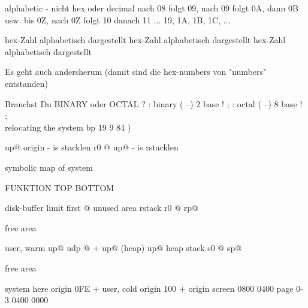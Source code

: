                                          
                                         
                                         
alphabetic - nicht hex oder decimal      
  nach 08 folgt 09, nach 09 folgt 0A,    
  dann 0B usw. bis 0Z, nach 0Z folgt 10  
  danach 11  ...  19, 1A, 1B, 1C, ...    
                                         
                                         
                                         
                                         
hex-Zahl  alphabetisch dargestellt       
hex-Zahl  alphabetisch dargestellt       
hex-Zahl  alphabetisch dargestellt       
                                         
                                         
Es geht auch andersherum                 
 (damit sind die hex-numbers von         
  "numbers" entstanden)                  
                                         
Brauchst Du BINARY oder OCTAL ?          
 : binary  ( --)   2 base ! ;            
 : octal  ( --)   8 base ! ;            
\\ relocating the system    bp 19 9 84 ) 
                                         
up@ origin -   is stacklen               
r0 @ up@ -     is rstacklen              
                                         
symbolic map of system                   
                                         
FUNKTION     TOP          BOTTOM         
                                         
disk-buffer  limit        first @        
 unused area                             
rstack       r0 @         rp@            
                                         
 free area                               
                                         
user, warm   up@ udp @ +  up@            
(heap)       up@          heap           
stack        s0 @         sp@            
                                         
 free area                               
                                         
system       here         origin 0FE +   
user, cold   origin 100 + origin         
screen       0800         0400           
page 0-3     0400         0000          
                                         

